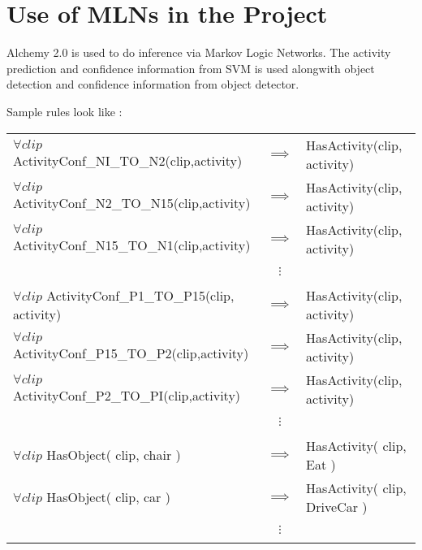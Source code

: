 \section{Use of MLNs in the Project}
Alchemy 2.0 is used to do inference via Markov Logic Networks.
The activity prediction and confidence information from SVM is used
alongwith object detection and confidence information from object detector.

Sample rules look like : \\
\begin{tabular}{l c l}
	\label{MLNRule01}
	$\forall clip$ ActivityConf\_NI\_TO\_N2(clip,activity) & $\implies$ & HasActivity(clip, activity) \\
	$\forall clip$ ActivityConf\_N2\_TO\_N15(clip,activity) & $\implies$ & HasActivity(clip, activity) \\
	$\forall clip$ ActivityConf\_N15\_TO\_N1(clip,activity) & $\implies$ & HasActivity(clip, activity) \\
	~ & $\vdots$ & ~ \\
	$\forall clip$ ActivityConf\_P1\_TO\_P15(clip, activity) & $\implies$ & HasActivity(clip, activity) \\
	$\forall clip$ ActivityConf\_P15\_TO\_P2(clip,activity) & $\implies$ & HasActivity(clip, activity) \\
	$\forall clip$ ActivityConf\_P2\_TO\_PI(clip,activity) & $\implies$ & HasActivity(clip, activity) \\
	~ & $\vdots$ & ~ \\
	$\forall clip$ HasObject( clip, chair ) & $\implies$ & HasActivity( clip, Eat ) \\
	$\forall clip$ HasObject( clip, car ) & $\implies$ & HasActivity( clip, DriveCar ) \\
	~ & $\vdots$ & ~ \\
\end{tabular}




\begin{comment}
\section{Example MLN}
\begin{tikzpicture}
	[every node/.style={oval}]
	\node (n1) at (5,10) {Friends(A,B)};
	\node (n6) at (1,10) {6};


\end{tikzpicture}
\end{comment}
